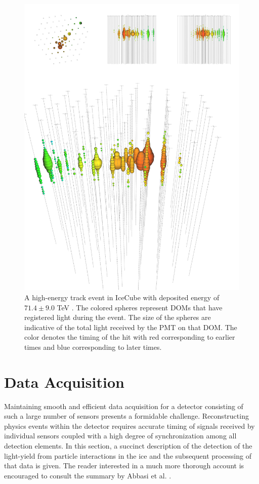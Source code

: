 \documentclass{gatech-thesis}
\begin{document}
\begin{figure}[ht]
  \begin{center}
    \includegraphics[width=1.0\textwidth,keepaspectratio]{hese_track_event.png}
  \end{center}
  \caption{A high-energy track event in IceCube with deposited energy of $71.4 \pm 9.0$ TeV \cite{2013Sci...342E...1I}. The colored spheres represent DOMs that have registered light during the event. The size of the spheres are indicative of the total light received by the PMT on that DOM. The color denotes the timing of the hit with red corresponding to earlier times and blue corresponding to later times.}
  \label{fig:track}
\end{figure}


\chapter{Data Acquisition}
Maintaining smooth and efficient data acquisition for a detector consisting of such a large number of sensors presents a formidable challenge. Reconstructing physics events within the detector requires accurate timing of signals received by individual sensors coupled with a high degree of synchronization among all detection elements. In this section, a succinct description of the detection of the light-yield from particle interactions in the ice and the subsequent processing of that data is given. The reader interested in a much more thorough account is encouraged to consult the summary by Abbasi et al. \cite{2009NIMPA.601..294A}. 
\end{document}

